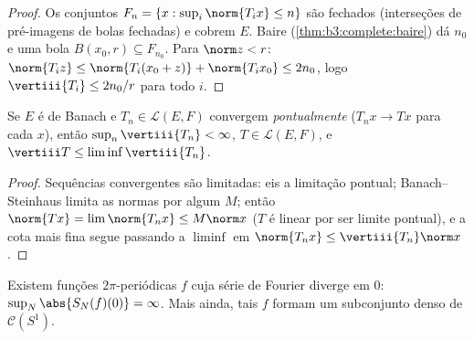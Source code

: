 \begin{proof}
Os conjuntos $F_n = \{x : \sup_i\norm{T_ix} \leq n\}$ são fechados (interseções de pré-imagens de bolas
fechadas) e cobrem $E$. Baire (\cref{thm:b3:complete:baire}) dá $n_0$ e uma
bola $B(x_0, r) \subseteq F_{n_0}$. Para $\norm z < r$: $\norm{T_iz}
\leq \norm{T_i(x_0 + z)} + \norm{T_ix_0} \leq 2n_0$, logo $\vertiii{T_i} \leq 2n_0/r$ para todo $i$.
\end{proof}

\begin{corollary}\label{cor:b3:banach:bslimits}
Se $E$ é de Banach e $T_n \in \mathcal L(E,F)$ convergem \emph{pontualmente} ($T_nx \to Tx$ para
cada $x$), então $\sup_n
\vertiii{T_n} < \infty$, $T \in \mathcal L(E, F)$, e $\vertiii T \leq \liminf \vertiii{T_n}$.
\end{corollary}

\begin{proof}
Sequências convergentes são limitadas: eis a limitação pontual;
Banach--Steinhaus limita as normas por algum $M$; então $\norm{Tx}
= \lim\norm{T_nx} \leq M\norm x$
($T$ é linear por ser limite pontual), e a cota mais fina segue
passando a $\liminf$ em $\norm{T_nx} \leq \vertiii{T_n}\norm x$.
\end{proof}

\begin{theorem}
\label{thm:b3:banach:fourierdiverge}
Existem funções  $2\pi$-periódicas $f$ cuja série de
Fourier diverge em $0$: $\sup_N\abs{S_N(f)(0)} =
\infty$. Mais ainda, tais $f$ formam um
subconjunto denso de $\mathcal
C(S^1)$.
\end{theorem}

